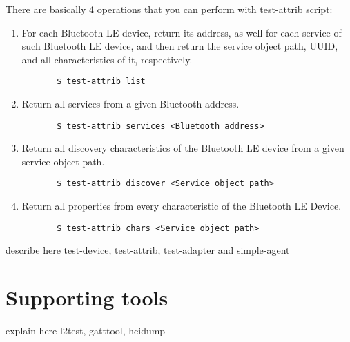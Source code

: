 \documentclass[11pt]{article}
\begin{document}
There are basically 4 operations that you can perform with test-attrib
script:
\begin{enumerate}
   \item For each Bluetooth LE device, return its address, as well for
     each service of such Bluetooth LE device, and then return the service
     object path, UUID, and all characteristics of it, respectively.
     \begin{verbatim}
       $ test-attrib list
     \end{verbatim}
   \item Return all services from a given Bluetooth address.
     \begin{verbatim}
       $ test-attrib services <Bluetooth address>
     \end{verbatim}
   \item Return all discovery characteristics of the Bluetooth LE device
     from a given service object path.
     \begin{verbatim}
       $ test-attrib discover <Service object path>
     \end{verbatim}
   \item Return all properties from every characteristic of the Bluetooth
     LE Device.
     \begin{verbatim}
       $ test-attrib chars <Service object path>
     \end{verbatim}
\end{enumerate}

describe here test-device, test-attrib, test-adapter and simple-agent

\section{Supporting tools}

explain here l2test, gatttool, hcidump
\end{document}
